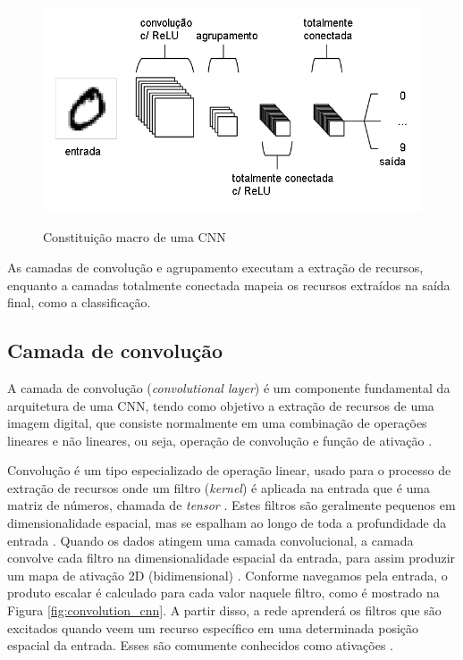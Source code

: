 \documentclass[
	12pt,				%
	oneside,			%
	a4paper,			%
	english,			%
	brazil				%
	]{abntex2ppgsi}
\begin{document}
\begin{figure}[H]
    \centering
    \caption{Constituição macro de uma CNN}
    \includegraphics[scale=.65]{imagens/conceitos_basicos/arquitetura_cnn_mnist.jpg}
    \label{fig:arquitetura_cnn_mnist}
\end{figure}

As camadas de convolução e agrupamento executam a extração de recursos, enquanto a camadas totalmente conectada mapeia os recursos extraídos na saída final, como a classificação.

\subsection{Camada de convolução}
A camada de convolução (\textit{convolutional layer}) é um componente fundamental da arquitetura de uma CNN, tendo como objetivo a extração de recursos de uma imagem digital, que consiste normalmente em uma combinação de operações lineares e não lineares, ou seja, operação de convolução e função de ativação \cite{yamashita2018convolutional}.

Convolução é um tipo especializado de operação linear, usado para o processo de extração de recursos onde um filtro (\textit{kernel}) é aplicada na entrada que é uma matriz de números, chamada de \textit{tensor} \cite{o2015introduction}. Estes filtros são geralmente pequenos em dimensionalidade espacial, mas se espalham ao longo de toda a profundidade da entrada \cite{o2015introduction}. Quando os dados atingem uma camada convolucional, a camada convolve cada filtro na dimensionalidade espacial da entrada, para assim produzir um mapa de ativação 2D (bidimensional) \cite{o2015introduction}. Conforme navegamos pela entrada, o produto escalar é calculado para cada valor naquele filtro, como é mostrado na Figura \ref{fig:convolution_cnn}. A partir disso, a rede aprenderá os filtros que são excitados quando veem um recurso específico em uma determinada posição espacial da entrada. Esses são comumente conhecidos como ativações \cite{o2015introduction}.
\end{document}
